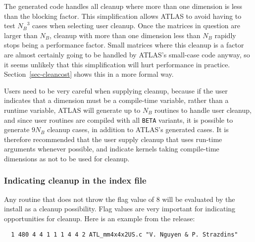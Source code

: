 \documentclass[11pt]{article}
\begin{document}
The generated code handles all cleanup where more
than one dimension is less than the blocking factor.  This simplification
allows ATLAS to avoid having to test ${N_B}^3$ cases when selecting user
cleanup.  Once the matrices in question are larger than $N_B$, cleanup
with more than one dimension less than $N_B$ rapidly stops being a 
performance factor.  Small matrices where this cleanup is a factor are
almost certainly going to be handled by ATLAS's small-case code anyway,
so it seems unlikely that this simplification will hurt performance in
practice.  Section~\ref{sec-cleancost} shows this in a more formal way.

Users need to be very careful when supplying cleanup, because if the user
indicates that a dimension must be a compile-time variable, rather than
a runtime variable, ATLAS will generate up to $N_B$ routines to handle
user cleanup, and since user routines are compiled with all {\tt BETA}
variants, it is possible to generate $9 N_B$ cleanup cases, in addition
to ATLAS's generated cases.  It is therefore recommended that the user
supply cleanup that uses run-time arguments whenever possible, and indicate
kernels taking compile-time dimensions as not to be used for cleanup.

\subsubsection{Indicating cleanup in the index file}
Any routine that does not throw the flag value of 8 will be evaluated by
the install as a cleanup possibility.  Flag values are very important
for indicating opportunities for cleanup.  Here is an example from the
release:
\begin{verbatim}
  1 480 4 4 1 1 1 4 4 2 ATL_mm4x4x2US.c "V. Nguyen & P. Strazdins"
\end{verbatim}
\end{document}
